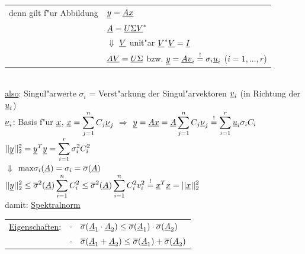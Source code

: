 \documentclass[openany,a4paper,11pt]{book}
\begin{document}
\begin{tabular}{ll}
    denn gilt f"ur Abbildung & $\uline{y}=\uline{Ax}$\\
    & $\uline{A}=\uline{U\Sigma V}^*$\\
    & $\Downarrow$ $\uline{V}$ unit"ar     $\uline{V}^*\uline{V}=\uline{I}$\\
    & $\uline{AV}=\uline{U\Sigma}$ bzw. $\uline{y}=\uline{Av}_i\stackrel{!}{=}\sigma_i\uline{u}_i$ ($i=1,\dots,r$)    
\end{tabular}\\
\uline{also}: Singul"arwerte $\sigma_i$ = Verst"arkung der Singul"arvektoren $\uline{v}_i$ (in Richtung der $\uline{u}_i$) \\
$\uline{\nu}_i$: Basis f"ur $\uline{x}$, $\displaystyle \uline{x}=\sum_{j=1}^nC_j\uline{\nu}_j$ $\Rightarrow$ $\displaystyle\uline{y}=\uline{Ax}=\uline{A}\sum_{j=1}^nC_j\uline{\nu}_j\stackrel{!}{=}\sum_{i=1}^r\uline{u}_i\sigma_iC_i$\\
$\displaystyle||\uline{y}||_2^2=\uline{y}^T\uline{y}=\sum_{i=1}^r\sigma_i^2C_i^2$ \\
\quad $\Downarrow$ \quad $\text{max} \sigma_i(\uline{A})=\sigma_i=\overline{\sigma}(\uline{A})$\\
$\displaystyle||\uline{y}||_2^2\leq\overline{\sigma}^2(\uline{A})\sum_{i=1}^nC_i^2\leq\overline{\sigma}^2(\uline{A})\sum_{i=1}^nC_i^2v_i^2\stackrel{!}{=}\uline{x}^T\uline{x}=||\uline{x}||_2^2$\\
damit:  \quad \uline{Spektralnorm}\\
\begin{tabular}{ll}
    \uline{Eigenschaften}: & $\cdot\quad\overline{\sigma}(\uline{A}_1\cdot\uline{A}_2)\leq\overline{\sigma}(\uline{A}_1)\cdot\overline{\sigma}(\uline{A}_2)$\\
    & $\cdot\quad\overline{\sigma}(\uline{A}_1+\uline{A}_2)\leq\overline{\sigma}(\uline{A}_1)+\overline{\sigma}(\uline{A}_2)$
\end{tabular}
\end{document}
